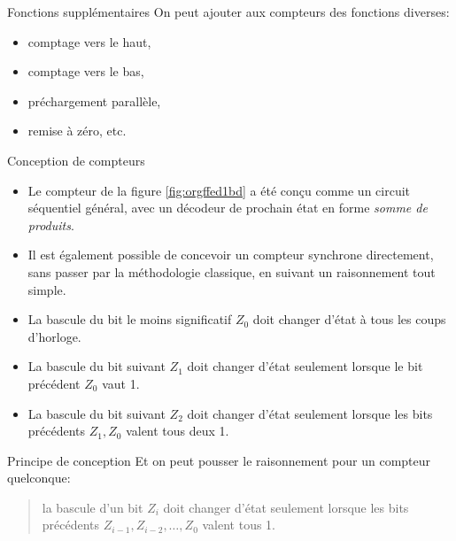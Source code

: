 \documentclass[presentation]{beamer}
\begin{document}
\begin{frame}[label={sec:orgb0310fb}]{Fonctions supplémentaires}
On peut ajouter aux compteurs des fonctions diverses: 

\begin{itemize}
\item comptage vers le haut,
\item comptage vers le bas,
\item préchargement parallèle,
\item remise à zéro, etc.
\end{itemize}
\end{frame}

\begin{frame}[label={sec:orgbcd0ae3}]{Conception de compteurs}
\begin{itemize}
\item Le compteur de la figure \ref{fig:orgffed1bd} a été conçu comme un circuit séquentiel général, avec un décodeur de prochain état en forme \emph{somme de produits}.

\item Il est également possible de concevoir un compteur synchrone directement, sans passer par la méthodologie classique, en suivant un raisonnement tout simple.

\item La bascule du bit le moins significatif \(Z_0\) doit changer d'état à tous les coups d'horloge.

\item La bascule du bit suivant \(Z_1\) doit changer d'état seulement lorsque le bit précédent \(Z_0\) vaut 1.

\item La bascule du bit suivant \(Z_2\) doit changer d'état seulement lorsque les bits précédents \(Z_1, Z_0\) valent tous deux 1.
\end{itemize}
\end{frame}

\begin{frame}[label={sec:org77ae2de}]{Principe de conception}
Et on peut pousser le raisonnement pour un compteur quelconque:
\begin{quote}
la bascule d'un bit \(Z_i\)
doit changer d'état seulement lorsque les bits précédents
\(Z_{i-1},Z_{i-2},\ldots, Z_0\) valent tous 1.
\end{quote}
\end{frame}
\end{document}
